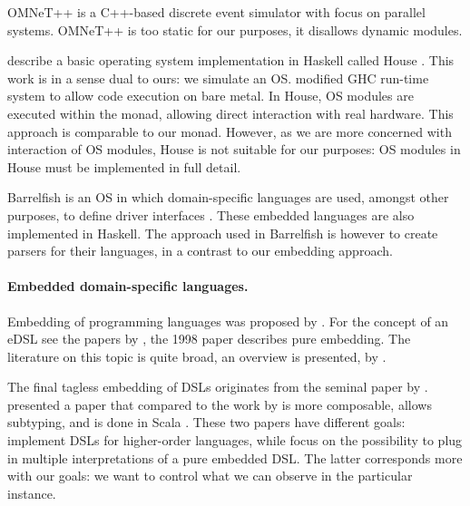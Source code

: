 OMNeT++ \cite{omnet} is a C++-based discrete event simulator with focus on parallel systems. OMNeT++ is too static for our purposes, it disallows dynamic modules.

\citeauthor{house} describe a basic operating system implementation in Haskell called House \cite{house}.
This work is in a sense dual to ours: we simulate an OS.
\citeauthor{house} modified GHC run-time system to allow code execution on bare metal.
In House, OS modules are executed within the  monad, allowing direct interaction with real hardware.
This approach is comparable to our  monad.
However, as we are more concerned with interaction of OS modules, House is not suitable for our purposes:  OS modules in House must be implemented in full detail.

Barrelfish \cite{Baumann:2009:MNO:1629575.1629579} is an OS in which domain-specific languages are used, amongst other purposes, to define driver interfaces \cite{barrelfish}.
These embedded languages are also implemented in Haskell.
The approach used in Barrelfish is however to create parsers for their languages, in a contrast to our embedding approach.


\paragraph{Embedded domain-specific languages.}
Embedding of programming languages was proposed by \citeauthor{Landin:1966:NPL:365230.365257} \cite{Landin:1966:NPL:365230.365257}.
For the concept of an eDSL see the papers by \citeauthor{hudak1} \cite{hudak1,hudak2}, the 1998 paper describes pure embedding.
The literature on this topic is quite broad, an overview is presented, \eg by \citeauthor{dsl-survey} \cite{dsl-survey}.

The final tagless embedding of DSLs originates from the seminal paper by \citeauthor{final_tagless_embedding} \cite{final_tagless_embedding}.
\citeauthor{Hofer:2008:PED:1449913.1449935} \cite{Hofer:2008:PED:1449913.1449935} presented a paper that compared to the work by \citeauthor{final_tagless_embedding} \cite{final_tagless_embedding} is more composable, allows subtyping, and is done in Scala \cite{odersky2008programming}.
These two papers have different goals: \citeauthor{final_tagless_embedding} implement DSLs for higher-order languages, while \citeauthor{Hofer:2008:PED:1449913.1449935} focus on the possibility to plug in multiple interpretations of a pure embedded DSL.
The latter corresponds more with our goals: we want to control  what we can observe in the particular instance.

